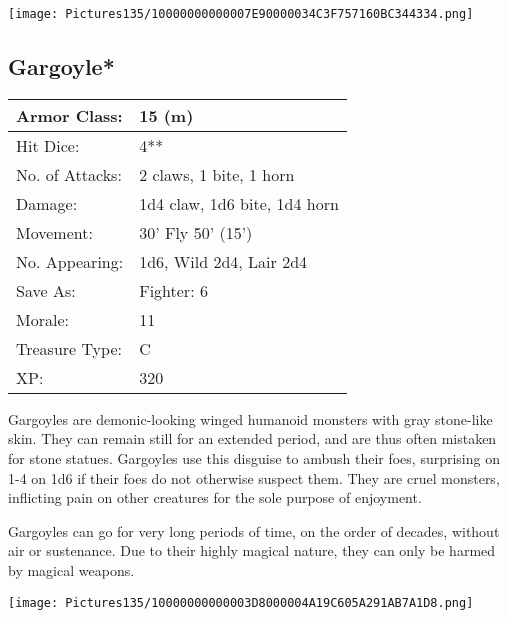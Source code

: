 \documentclass[a4paper,twoside,openany,10pt]{book}
\begin{document}
\begin{center}
	\texttt{[image: Pictures135/10000000000007E90000034C3F757160BC344334.png]}
\end{center}

\begin{multicols}{2}
	

\subsection*{Gargoyle*}\label{gargoyle}

\begin{tabularx}{0.48\textwidth}{@{}lX@{}}
Armor Class: & 15 (m) \\\hline
Hit Dice: & 4** \\\hline
No. of Attacks: & 2 claws, 1 bite, 1 horn \\\hline
Damage: & 1d4 claw, 1d6 bite, 1d4 horn \\\hline
Movement: & 30' Fly 50'
(15') \\\hline
No. Appearing: & 1d6, Wild 2d4, Lair 2d4 \\\hline
Save As: & Fighter: 6 \\\hline
Morale: & 11 \\\hline
Treasure Type: & C \\\hline
XP: & 320 \\\hline
\end{tabularx}\medskip



Gargoyles are demonic-looking winged humanoid monsters with gray stone-like skin. They can remain still for an extended period, and are thus often mistaken for stone statues. Gargoyles use this disguise to ambush their foes, surprising on 1-4 on 1d6 if their foes do not otherwise suspect them. They are cruel monsters, inflicting pain on other creatures for the sole purpose of enjoyment.

Gargoyles can go for very long periods of time, on the order of decades, without air or sustenance. Due to their highly magical nature, they can only be harmed by magical weapons.

\end{multicols}

\vfill

\begin{center}
	\texttt{[image: Pictures135/10000000000003D8000004A19C605A291AB7A1D8.png]}
\end{center}
\end{document}
